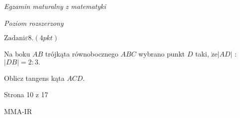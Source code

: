 \documentclass[a4paper,12pt]{article}
\begin{document}
{\it Egzamin maturalny z matematyki}

{\it Poziom rozszerzony}

$\mathrm{Z}\mathrm{a}\mathrm{d}\mathrm{a}\mathrm{n}\mathrm{i}\varepsilon 8. (4pkt)$

Na boku $AB$ trójkąta równobocznego $ABC$ wybrano punkt $D$ taki, $\dot{\mathrm{z}}\mathrm{e}|AD|$ : $|DB|=2:3.$

Oblicz tangens kąta $ACD.$

Strona 10 z 17

MMA-IR
\end{document}
